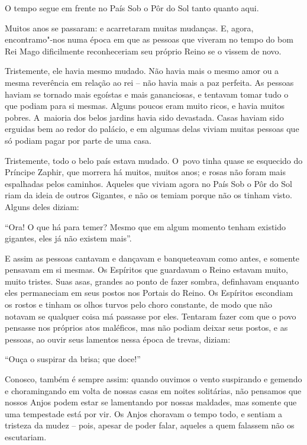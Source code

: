  

O tempo segue em frente no País Sob o Pôr do Sol tanto quanto aqui.

Muitos anos se passaram: e acarretaram muitas mudanças. E, agora,
encontramo"-nos numa época em que as pessoas que viveram no tempo do bom
Rei Mago dificilmente reconheceriam seu próprio Reino se o vissem de
novo.

Tristemente, ele havia mesmo mudado. Não havia mais o mesmo amor ou a
mesma reverência em relação ao rei -- não havia mais a paz perfeita. As
pessoas haviam se tornado mais egoístas e mais gananciosas, e tentavam
tomar tudo o que podiam para si mesmas. Alguns poucos eram muito ricos,
e havia muitos pobres. A~maioria dos belos jardins havia sido devastada.
Casas haviam sido erguidas bem ao redor do palácio, e em algumas delas
viviam muitas pessoas que só podiam pagar por parte de uma casa.

Tristemente, todo o belo país estava mudado. O~povo tinha quase se
esquecido do Príncipe Zaphir, que morrera há muitos, muitos anos; e
rosas não foram mais espalhadas pelos caminhos. Aqueles que viviam agora
no País Sob o Pôr do Sol riam da ideia de outros Gigantes, e não os
temiam porque não os tinham visto. Alguns deles diziam:

``Ora! O que há para temer? Mesmo que em algum momento tenham existido
gigantes, eles já não existem mais''.

E assim as pessoas cantavam e dançavam e banqueteavam como antes, e
somente pensavam em si mesmas. Os Espíritos que guardavam o Reino
estavam muito, muito tristes. Suas asas, grandes ao ponto de fazer
sombra, definhavam enquanto eles permaneciam em seus postos nos Portais
do Reino. Os Espíritos escondiam os rostos e tinham os olhos turvos pelo
choro constante, de modo que não notavam se qualquer coisa má passasse
por eles. Tentaram fazer com que o povo pensasse nos próprios atos
maléficos, mas não podiam deixar seus postos, e as pessoas, ao ouvir
seus lamentos nessa época de trevas, diziam:

``Ouça o suspirar da brisa; que doce!''

Conosco, também é sempre assim: quando ouvimos o vento suspirando e
gemendo e choramingando em volta de nossas casas em noites solitárias,
não pensamos que nossos Anjos podem estar se lamentando por nossas
maldades, mas somente que uma tempestade está por vir. Os Anjos choravam
o tempo todo, e sentiam a tristeza da mudez -- pois, apesar de poder
falar, aqueles a quem falassem não os escutariam.

